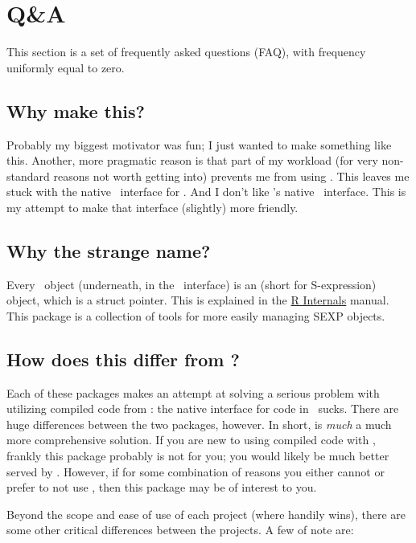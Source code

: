 \section{Q\&A}

This section is a set of frequently asked questions (FAQ), with frequency uniformly
equal to zero.


\subsection{Why make this?}

Probably my biggest motivator was fun; I just wanted to make something like this.  Another,
more pragmatic reason is that part of my workload (for very non-standard reasons not worth 
getting into) prevents me from using .  This leaves me stuck with the native \C\ 
interface for \R.  And I don't like \R's native \C\ interface.  This is my attempt to 
make that interface (slightly) more friendly.


\subsection{Why the strange name?}

Every \R\ object (underneath, in the \C\ interface) is an  (short for
S-expression) object, which is a struct pointer.  This is explained in the
\href{http://cran.r-project.org/doc/manuals/R-ints.html#SEXPs}{R Internals} 
manual.  This package is a collection of tools for more easily managing SEXP 
objects.


\subsection{How does this differ from ?}
Each of these packages makes an attempt at solving a serious problem with utilizing compiled
code from \R: the native interface for \proglang{C} code in \R\ sucks.  There are huge 
differences between the two packages, however. In short, \pkg{Rcpp} is \emph{much} a much 
more comprehensive solution.  If you are new to using compiled code with \R, frankly this 
package probably is not for you; you would likely be much better served by .  
However, if for some combination of reasons you either cannot or prefer to not use 
\pkg{Rcpp}, then this package may be of interest to you.

Beyond the scope and ease of use of each project (where  handily wins), there are
some other critical differences between the projects.  A few of note are:

